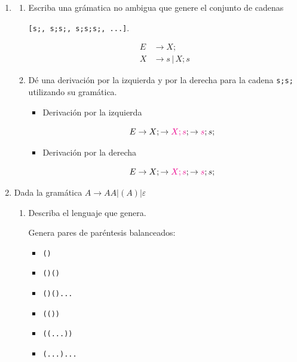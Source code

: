 \documentclass[a4paper, twoside, 12pt]{article}
\begin{document}
\begin{enumerate}
    \item \begin{enumerate}
        \item Escriba una grámatica no ambigua que genere el conjunto de cadenas

        \texttt{[s;, s;s;, s;s;s;, ...]}.

            \begin{align*}
                E &\rightarrow X; \\
                X &\rightarrow s \, | \, X; s
            \end{align*}
        
        \item Dé una derivación por la izquierda y por la derecha para la cadena \texttt{s;s;} utilizando su gramática.

        \begin{itemize}
            \item Derivación por la izquierda

            $$ 
                E \rightarrow X; \rightarrow {\color{magenta}{X;s}}; \rightarrow {\color{magenta}{s}};s;
            $$

            \item Derivación por la derecha

            $$ 
                E \rightarrow X; \rightarrow {\color{magenta}{X;s}}; \rightarrow {\color{magenta}{s}};s;
            $$
        \end{itemize}
    \end{enumerate}

    \item Dada la gramática $A\rightarrow AA | (A)|\varepsilon$
    
    \begin{enumerate}
        \item Describa el lenguaje que genera.
        
        Genera pares de paréntesis balanceados:
        \begin{itemize}
            \item \texttt{()}
            \item \texttt{()()}
            \item \texttt{()()...}
            \item \texttt{(())}
            \item \texttt{((...))}
            \item \texttt{(...)...}
        \end{itemize}
        

\end{enumerate}
\end{enumerate}
\end{document}
